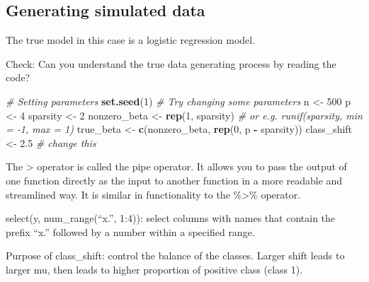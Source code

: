 \documentclass[
]{article}
\author{}
\date{\vspace{-2.5em}}
\newenvironment{Shaded}{\begin{snugshade}}{\end{snugshade}}
\newcommand{\CommentTok}[1]{\textcolor[rgb]{0.56,0.35,0.01}{\textit{#1}}}
\newcommand{\DecValTok}[1]{\textcolor[rgb]{0.00,0.00,0.81}{#1}}
\newcommand{\FloatTok}[1]{\textcolor[rgb]{0.00,0.00,0.81}{#1}}
\newcommand{\FunctionTok}[1]{\textcolor[rgb]{0.13,0.29,0.53}{\textbf{#1}}}
\newcommand{\NormalTok}[1]{#1}
\newcommand{\OtherTok}[1]{\textcolor[rgb]{0.56,0.35,0.01}{#1}}
\newcommand{\SpecialCharTok}[1]{\textcolor[rgb]{0.81,0.36,0.00}{\textbf{#1}}}
\begin{document}
\subsection{Generating simulated data}\label{generating-simulated-data}

The true model in this case is a logistic regression model.

Check: Can you understand the true data generating process by reading
the code?

\begin{Shaded}
\begin{Highlighting}[]
\CommentTok{\# Setting parameters}
\FunctionTok{set.seed}\NormalTok{(}\DecValTok{1}\NormalTok{)}
\CommentTok{\# Try changing some parameters}
\NormalTok{n }\OtherTok{\textless{}{-}} \DecValTok{500}
\NormalTok{p }\OtherTok{\textless{}{-}} \DecValTok{4}
\NormalTok{sparsity }\OtherTok{\textless{}{-}} \DecValTok{2}
\NormalTok{nonzero\_beta }\OtherTok{\textless{}{-}} 
  \FunctionTok{rep}\NormalTok{(}\DecValTok{1}\NormalTok{, sparsity) }\CommentTok{\# or e.g. runif(sparsity, min = {-}1, max = 1)}
\NormalTok{true\_beta }\OtherTok{\textless{}{-}} \FunctionTok{c}\NormalTok{(nonzero\_beta, }\FunctionTok{rep}\NormalTok{(}\DecValTok{0}\NormalTok{, p }\SpecialCharTok{{-}}\NormalTok{ sparsity))}
\NormalTok{class\_shift }\OtherTok{\textless{}{-}} \FloatTok{2.5} \CommentTok{\# change this}
\end{Highlighting}
\end{Shaded}

The \textbar\textgreater{} operator is called the pipe operator. It
allows you to pass the output of one function directly as the input to
another function in a more readable and streamlined way. It is similar
in functionality to the \%\textgreater\% operator.

select(y, num\_range(``x.'', 1:4)): select columns with names that
contain the prefix ``x.'' followed by a number within a specified range.

Purpose of class\_shift: control the balance of the classes. Larger
shift leads to larger mu, then leads to higher proportion of positive
class (class 1).
\end{document}
